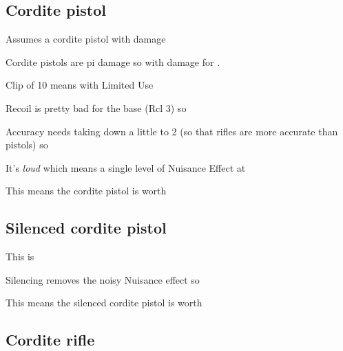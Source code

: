 \subsection{Cordite pistol}
\label{sec:cordite-pistol}

Assumes a cordite pistol with  damage

\begin{innateattack}
  \item Cordite pistols are pi damage so  with
     damage for .
  \item Clip of 10 means  with Limited Use
  \item Recoil is pretty bad for the base (Rcl 3) so
  \item Accuracy needs taking down a little to 2 (so that rifles are more
    accurate than pistols) so 
  \item It's \emph{loud} which means a single level of Nuisance Effect at
  \item This means the cordite pistol is worth \InnateAttackTotalPoints{}
\end{innateattack}

\begin{center}
  \InnateAttackBreakdown
\end{center}
\subsection{Silenced cordite pistol}
\label{sec:silenc-cord-pist}

\begin{innateattack}
  \item This is 
  \item Silencing removes the noisy Nuisance effect so
  \item This means the silenced cordite pistol is worth
    \InnateAttackTotalPoints{}
\end{innateattack}

\begin{center}
  \InnateAttackBreakdown
\end{center}
\subsection{Cordite rifle}
\label{sec:cordite-rifle}

